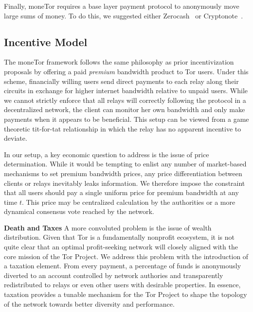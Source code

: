 Finally, moneTor requires a base layer payment protocol to anonymously move
large sums of money. To do this, we suggested either
Zerocash~\cite{sasson2014zerocash} or Cryptonote~\cite{van2013cryptonote}.

\subsection{Incentive Model}
The moneTor framework follows the same philosophy as prior incentivization
proposals by offering a paid \emph{premium} bandwidth product to Tor
users. Under this scheme, financially willing users send direct payments to each
relay along their circuits in exchange for higher internet bandwidth relative to
unpaid users. While we cannot strictly enforce that all relays will correctly
following the protocol in a decentralized network, the client can monitor her
own bandwidth and only make payments when it appears to be beneficial. This
setup can be viewed from a game theoretic tit-for-tat relationship in which the
relay has no apparent incentive to deviate.

In our setup, a key economic question to address is the issue of price
determination. While it would be tempting to enlist any number of market-based
mechanisms to set premium bandwidth prices, any price differentiation between
clients or relays inevitably leaks information. We therefore impose the
constraint that all users should pay a single uniform price for premium
bandwidth at any time $t$. This price may be centralized calculation by the
authorities or a more dynamical consensus vote reached by the network.

\textbf{Death and Taxes} A more convoluted problem is the issue of wealth
distribution. Given that Tor is a fundamentally nonprofit ecosystem, it is not
quite clear that an optimal profit-seeking network will closely aligned with the
core mission of the Tor Project. We address this problem with the introduction
of a taxation element. From every payment, a percentage of funds is anonymously
diverted to an account controlled by network authories and transparently
redistributed to relays or even other users with desirable properties. In
essence, taxation provides a tunable mechanism for the Tor Project to shape the
topology of the network towards better diversity and performance.

